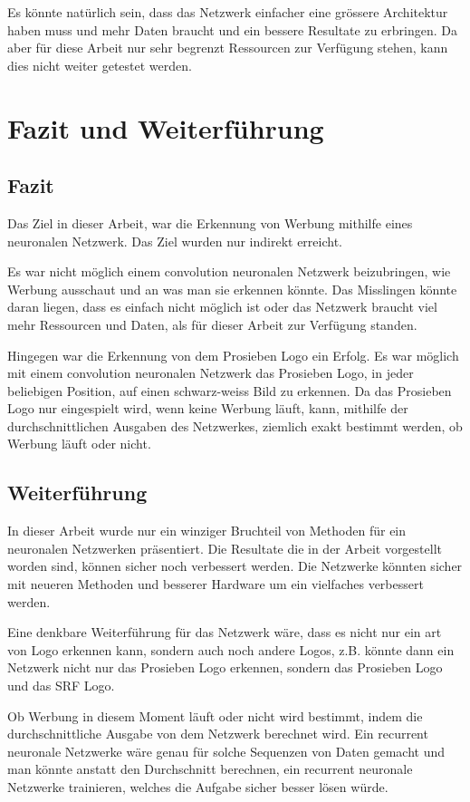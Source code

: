 \documentclass[12pt,a4paper]{report}
\begin{document}
Es könnte natürlich sein, dass das Netzwerk einfacher eine grössere Architektur haben muss und mehr Daten braucht und ein bessere Resultate zu erbringen.
Da aber für diese Arbeit nur sehr begrenzt Ressourcen zur Verfügung stehen, kann dies nicht weiter getestet werden.


\chapter{Fazit und Weiterführung}\label{ch:fazitUndWeiterführung}
\section{Fazit}
Das Ziel in dieser Arbeit, war die Erkennung von Werbung mithilfe eines neuronalen Netzwerk.
Das Ziel wurden nur indirekt erreicht.

Es war nicht möglich einem convolution neuronalen Netzwerk beizubringen, wie Werbung ausschaut und an was man sie erkennen könnte.
Das Misslingen könnte daran liegen, dass es einfach nicht möglich ist oder das Netzwerk braucht viel mehr Ressourcen und Daten,
als für dieser Arbeit zur Verfügung standen.

Hingegen war die Erkennung von dem Prosieben Logo ein Erfolg.
Es war möglich mit einem convolution neuronalen Netzwerk das Prosieben Logo, in jeder beliebigen Position, auf einen schwarz-weiss Bild zu erkennen.
Da das Prosieben Logo nur eingespielt wird, wenn keine Werbung läuft,
kann, mithilfe der durchschnittlichen Ausgaben des Netzwerkes, ziemlich exakt bestimmt werden, ob Werbung läuft oder nicht.

\section{Weiterführung}
In dieser Arbeit wurde nur ein winziger Bruchteil von Methoden für ein neuronalen Netzwerken präsentiert.
Die Resultate die in der Arbeit vorgestellt worden sind, können sicher noch verbessert werden.
Die Netzwerke könnten sicher mit neueren Methoden und besserer Hardware um ein vielfaches verbessert werden.

Eine denkbare Weiterführung für das Netzwerk wäre, dass es nicht nur ein art von Logo erkennen kann, sondern auch noch andere Logos,
z.B. könnte dann ein Netzwerk nicht nur das Prosieben Logo erkennen, sondern das Prosieben Logo und das SRF Logo.

Ob Werbung in diesem Moment läuft oder nicht wird bestimmt, indem die durchschnittliche Ausgabe von dem Netzwerk berechnet wird.
Ein recurrent neuronale Netzwerke\cite{wiki:rnn} wäre genau für solche Sequenzen von Daten gemacht und man könnte anstatt den Durchschnitt berechnen,
ein recurrent neuronale Netzwerke trainieren, welches die Aufgabe sicher besser lösen würde.
\end{document}
